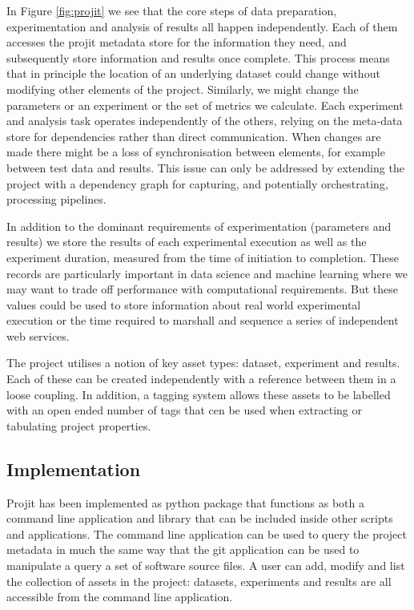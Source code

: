 \documentclass[sigconf]{acmart}
\begin{document}
In Figure \ref{fig:projit} we see that the core steps of data preparation, experimentation
and analysis of results all happen independently. Each of them accesses the projit metadata 
store for the information they need, and subsequently store information and results once 
complete. This process means that in principle the location of an underlying dataset 
could change without modifying other elements of the project. Similarly, we might change 
the parameters or an experiment or the set of metrics we calculate. Each experiment and 
analysis task operates independently of the others, relying on the meta-data store for 
dependencies rather than direct communication. When changes are made there might be a
loss of synchronisation between elements, for example between test data and results. 
This issue can only be addressed by extending the project with a dependency graph for 
capturing, and potentially orchestrating, processing pipelines.

In addition to the dominant requirements of experimentation (parameters and results) we 
store the results of each experimental execution as well as the experiment duration, 
measured from the time of initiation to completion. These records are particularly 
important in data science and machine learning where we may want to trade off 
performance with computational requirements. But these values could be used to store
information about real world experimental execution or the time required to marshall 
and sequence a series of independent web services. 

The project utilises a notion of key asset types: dataset, experiment and results. Each
of these can be created independently with a reference between them in a loose coupling.
In addition, a tagging system allows these assets to be labelled with an open ended number
of tags that cen be used when extracting or tabulating project properties.

\subsection{Implementation}

Projit has been implemented as python package that functions as both a command line 
application and library that can be included inside other scripts and applications. 
The command line application can be used to query the project metadata in much the 
same way that the git application can be used to manipulate a query a set of software
source files. A user can add, modify and list the collection of assets in the 
project: datasets, experiments and results are all accessible from the command line 
application.
\end{document}
